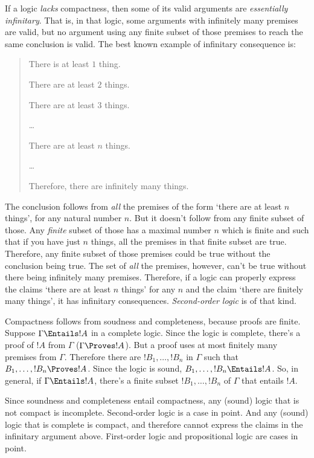 \documentclass[../../../include/open-logic-section]{subfiles}
\begin{document}
If a logic \emph{lacks} compactness, then some of its valid arguments
are \emph{essentially infinitary}. That is, in that logic, some
arguments with infinitely many premises are valid, but no argument
using any finite subset of those premises to reach the same conclusion
is valid. The best known example of infinitary consequence is:
\begin{quote}
There is at least $1$ thing.

There are at least $2$ things.

There are at least $3$ things.

\dots

There are at least $n$ things.

\dots

Therefore, there are infinitely many things.

\end{quote}
The conclusion follows from \emph{all} the premises of the form `there
are at least $n$ things', for any natural number $n$. But it doesn't
follow from any finite subset of those. Any \emph{finite} subset of
those has a maximal number $n$ which is finite and such that if you
have just $n$ things, all the premises in that finite subset are true.
Therefore, any finite subset of those premises could be true without
the conclusion being true. The set of \emph{all} the premises, however,
can't be true without there being infinitely many premises. 
Therefore, if a logic can properly express the claims `there are at
least $n$ things' for any $n$ and the claim `there are finitely many
things', it has infinitary consequences. \emph{Second-order logic} is
of that kind.

Compactness follows from soudness and completeness, because proofs are
finite. Suppose $\Gamma \Entails !A$ in a complete logic. Since the
logic is complete, there's a proof of $!A$ from $\Gamma$ ($\Gamma
\Proves !A$). But a proof uses at most finitely many premises from
$\Gamma$. Therefore there are $!B_1,\ldots,!B_n$ in $\Gamma$ such that
$B_1,\ldots,!B_n\Proves !A$. Since the logic is sound,
$B_1,\ldots,!B_n\Entails !A$. So, in general, if $\Gamma \Entails !A$,
there's a finite subset $!B_1,\ldots,!B_n$ of $\Gamma$ that entails
$!A$.

Since soundness and completeness entail compactness, any (sound) logic
that is not compact is incomplete. Second-order logic is a case in point.
And any (sound) logic that is complete is compact, and therefore
cannot express the claims in the infinitary argument above. First-order 
logic and propositional logic are cases in point.
\end{document}
